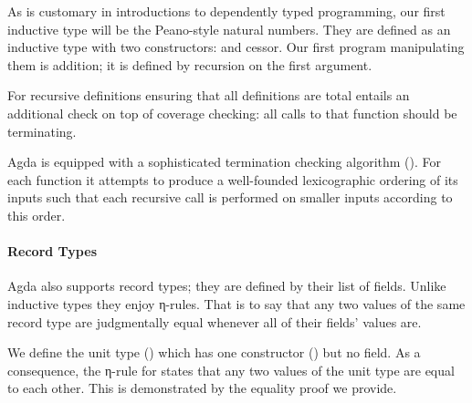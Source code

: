 As is customary in introductions to dependently typed programming, our first
inductive type will be the Peano-style natural numbers.%
They are defined as an inductive
type with two constructors:  and cessor. Our first program
manipulating them is addition; it is defined by recursion on the first argument.

\begin{minipage}{0.5\textwidth}
\end{minipage}\begin{minipage}{0.5\textwidth}
\end{minipage}

For recursive definitions ensuring that all definitions are total entails
an additional check on top of coverage checking: all calls to that function
should be terminating.

\begin{feature} Agda is equipped with a sophisticated
termination checking algorithm (\cite{abel1998foetus}). For each function it
attempts to produce a well-founded lexicographic ordering of its inputs such
that each recursive call is performed on smaller inputs according to this
order.
\end{feature}

\paragraph{Record Types}\label{par:recordtypes}

Agda also supports record types; they are defined by their list of fields.
Unlike inductive types they enjoy η-rules. That is to say that any two
values of the same record type are judgmentally equal whenever all of their
fields' values are.

We define the unit type () which has one constructor () but no
field. As a consequence, the η-rule for  states that any two values of
the unit type are equal to each other. This is demonstrated by the equality
proof we provide.

\begin{minipage}[t]{0.5\textwidth}
\end{minipage}
\begin{minipage}[t]{0.5\textwidth}
\end{minipage}

